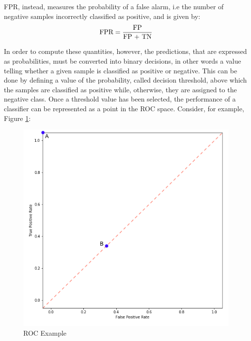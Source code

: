 \ac{FPR}, instead, measures the probability of a false alarm, i.e the number of negative samples incorrectly classified as positive, and is given by: 
\begin{equation}
\textup{FPR} = \frac{\textup{FP}}{\textup{FP + TN}}
    \label{eq:equation_5.1}
\end{equation}

In order to compute these quantities, however, the predictions, that are expressed as probabilities, must be converted into binary decisions, in other words a value telling whether a given sample is classified as positive or negative. This can be done by defining a value of the probability, called decision threshold, above which the samples are classified as positive while, otherwise, they are assigned to the negative class. Once a threshold value has been selected, the performance of a classifier can be represented as a point in the ROC space. Consider, for example, Figure \ref{fig:figure_5.1}:
\vspace{5mm}
\begin{figure}[htbp!]
    \centering
    \includegraphics[scale=0.45]{Tesi/images/ROC.png}
    \caption{ROC Example}
    \label{fig:figure_5.1}
\end{figure}

